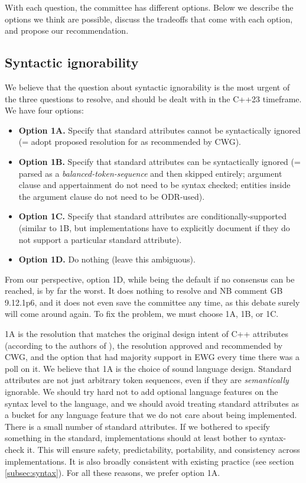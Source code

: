 With each question, the committee has different options. Below we describe the options we think are possible, discuss the tradeoffs that come with each option, and propose our recommendation.

\subsection{Syntactic ignorability}

We believe that the question about syntactic ignorability is the most urgent of the three questions to resolve, and should be dealt with in the C++23 timeframe. We have four options:

\begin{itemize}
\item \textbf{Option 1A.} Specify that standard attributes cannot be syntactically ignored (= adopt proposed resolution for \cite{CWG2538} as recommended by CWG).
\item \textbf{Option 1B.} Specify that standard attributes can be syntactically ignored (= parsed as a \emph{balanced-token-sequence} and then skipped entirely; argument clause and appertainment do not need to be syntax checked; entities inside the argument clause do not need to be ODR-used).
\item \textbf{Option 1C.} Specify that standard attributes are conditionally-supported (similar to 1B, but implementations have to explicitly document if they do not support a particular standard attribute).
\item \textbf{Option 1D.} Do nothing (leave this ambiguous).
\end{itemize}

From our perspective, option 1D, while being the default if no consensus can be reached, is by far the worst. It does nothing to resolve \cite{CWG2538} and NB comment GB 9.12.1p6, and it does not even save the committee any time, as this debate surely will come around again. To fix the problem, we must choose 1A, 1B, or 1C.

1A is the resolution that matches the original design intent of C++ attributes (according to the authors of \cite{N2761}), the resolution approved and recommended by CWG, and the option that had majority support in EWG every time there was a poll on it. We believe that 1A is the choice of sound language design. Standard attributes are not just arbitrary token sequences, even if they are \emph{semantically} ignorable. We should try hard not to add optional language features on the syntax level to the language, and we should avoid treating standard attributes as a bucket for any language feature that we do not care about being implemented. There is a small number of standard attributes. If we bothered to specify something in the
standard, implementations should at least bother to syntax-check it. This will ensure safety, predictability, portability, and consistency across implementations. It is also broadly consistent with existing practice (see section \ref{subsec:syntax}). For all these reasons, we prefer option 1A.


